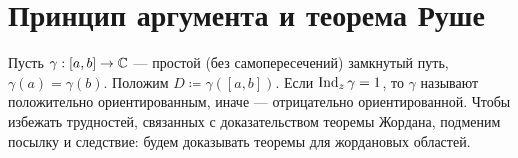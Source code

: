 \documentclass[a4paper]{report}
\begin{document}
    \section{Принцип аргумента и теорема Руше}
    Пусть $\gamma: [a, b] \rightarrow \mathbb{C}$ --- простой (без самопересечений) замкнутый путь, $\gamma(a) = \gamma(b)$.
    Положим $D \coloneqq \gamma([a, b])$.
    Если $\operatorname{Ind}_{z}\gamma = 1$, то $\gamma$ называют положительно ориентированным, иначе --- отрицательно ориентированной.
    Чтобы избежать трудностей, связанных с доказательством теоремы Жордана, подменим посылку и следствие: будем доказывать теоремы для жордановых областей.
\end{document}
